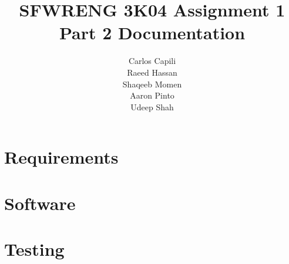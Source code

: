 \documentclass[12pt]{article}
\title{SFWRENG 3K04 Assignment 1 Part 2 Documentation}
\author{
    Carlos Capili \\
    Raeed Hassan \\
    Shaqeeb Momen \\
    Aaron Pinto \\
    Udeep Shah
}
\date{}
\begin{document}
\maketitle \newpage
\tableofcontents \newpage

\section{Requirements}

\newpage
\section{Software}

\newpage
\section{Testing}
\end{document}
